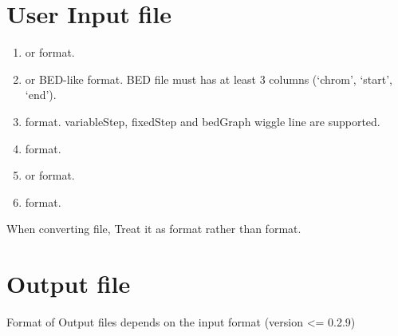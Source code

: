 \documentclass[letterpaper,10pt,english]{sphinxmanual}
\begin{document}
\section{User Input file}
\label{\detokenize{index:user-input-file}}\begin{enumerate}
\item {} 
 or  format.

\item {} 
 or BED-like format. BED file must has at least 3 columns (`chrom', `start', `end').

\item {} 
 format. \sphinxquotedblleft{}variableStep\sphinxquotedblright{}, \sphinxquotedblleft{}fixedStep\sphinxquotedblright{} and \sphinxquotedblleft{}bedGraph\sphinxquotedblright{} wiggle line are supported.

\item {} 
 format.

\item {} 
 or  format.

\item {} 
 format.

\end{enumerate}

 When converting  file, Treat it as  format rather than  format.


\section{Output file}
\label{\detokenize{index:output-file}}
Format of Output files depends on the input format (version \textless{}= 0.2.9)
\end{document}
